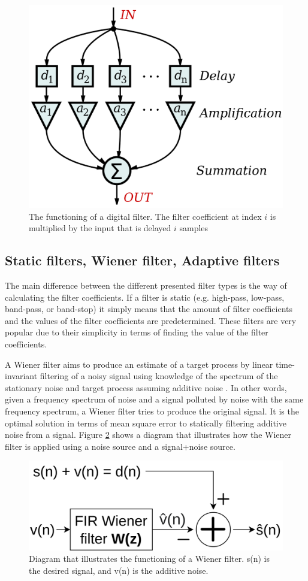 \begin{figure}[h!t]
	\begin{center}
		\includegraphics[width=0.4\columnwidth]{images/wikipedia_fir_digital_filter.png}
	\end{center}
	\caption{The functioning of a digital filter. The filter coefficient at index $i$ is multiplied by the input that is delayed $i$ samples \cite{wikipedia:digital_fir_filter_image}}
	\label{fig:wiki_digital_filter_working}
\end{figure}

\subsection{Static filters, Wiener filter, Adaptive filters}\label{sec:filters_theory}
The main difference between the different presented filter types is the way of calculating the filter coefficients. If a filter is static (e.g. high-pass, low-pass, band-pass, or band-stop) it simply means that the amount of filter coefficients and the values of the filter coefficients are predetermined. These filters are very popular due to their simplicity in terms of finding the value of the filter coefficients. 

A Wiener filter aims to produce an estimate of a target process by linear time-invariant filtering of a noisy signal using knowledge of the spectrum of the stationary noise and target process assuming additive noise \cite{wiki:Wiener_filter} \cite{lecture_adaptive_filters_1}. In other words, given a frequency spectrum of noise and a signal polluted by noise with the same frequency spectrum, a Wiener filter tries to produce the original signal. It is the optimal solution in terms of mean square error to statically filtering additive noise from a signal. Figure \ref{fig:wiener_filter_diagram} shows a diagram that illustrates how the Wiener filter is applied using a noise source and a signal+noise source.

\begin{figure}[h!t]
	\begin{center}
		\includegraphics[width=0.7\columnwidth]{images/WienerFilterDiagram.png}
	\end{center}
	\caption{Diagram that illustrates the functioning of a Wiener filter. s(n) is the desired signal, and v(n) is the additive noise.}
	\label{fig:wiener_filter_diagram}
\end{figure}

